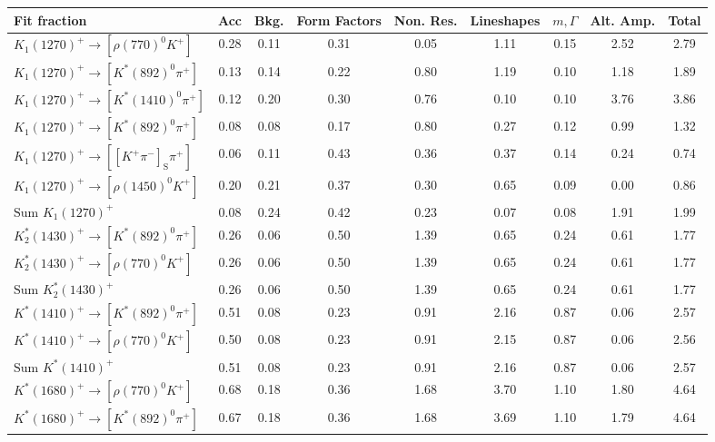 \begin{tabular}{l  c  c  c  c  c  c  c  | c }
\hline
\hline
Fit fraction & Acc & Bkg. & Form Factors & Non. Res. & Lineshapes & $m,\Gamma$ & Alt. Amp. &  Total  \\ 
\hline
$K_{1}(1270)^{+}\rightarrow \left[\rho(770)^{0}K^{+}\right]$ & 0.28 & 0.11 & 0.31 & 0.05 & 1.11 & 0.15 & 2.52 & 2.79 \\ 
$K_{1}(1270)^{+}\rightarrow \left[K^{*}(892)^{0}\pi^{+}\right]$ & 0.13 & 0.14 & 0.22 & 0.80 & 1.19 & 0.10 & 1.18 & 1.89 \\ 
$K_{1}(1270)^{+}\rightarrow \left[K^{*}(1410)^{0}\pi^{+}\right]$ & 0.12 & 0.20 & 0.30 & 0.76 & 0.10 & 0.10 & 3.76 & 3.86 \\ 
$K_{1}(1270)^{+}\rightarrow \left[K^{*}(892)^{0}\pi^{+}\right]$ & 0.08 & 0.08 & 0.17 & 0.80 & 0.27 & 0.12 & 0.99 & 1.32 \\ 
$K_{1}(1270)^{+}\rightarrow \left[\left[K^{+}\pi^{-}\right]_{\text{S}}\pi^{+}\right]$ & 0.06 & 0.11 & 0.43 & 0.36 & 0.37 & 0.14 & 0.24 & 0.74 \\ 
$K_{1}(1270)^{+}\rightarrow \left[\rho(1450)^{0}K^{+}\right]$ & 0.20 & 0.21 & 0.37 & 0.30 & 0.65 & 0.09 & 0.00 & 0.86 \\ 
$\text{Sum } K_{1}(1270)^{+}$ & 0.08 & 0.24 & 0.42 & 0.23 & 0.07 & 0.08 & 1.91 & 1.99 \\ 
$K_{2}^{*}(1430)^{+}\rightarrow \left[K^{*}(892)^{0}\pi^{+}\right]$ & 0.26 & 0.06 & 0.50 & 1.39 & 0.65 & 0.24 & 0.61 & 1.77 \\ 
$K_{2}^{*}(1430)^{+}\rightarrow \left[\rho(770)^{0}K^{+}\right]$ & 0.26 & 0.06 & 0.50 & 1.39 & 0.65 & 0.24 & 0.61 & 1.77 \\ 
$\text{Sum } K_{2}^{*}(1430)^{+}$ & 0.26 & 0.06 & 0.50 & 1.39 & 0.65 & 0.24 & 0.61 & 1.77 \\ 
$K^{*}(1410)^{+}\rightarrow \left[K^{*}(892)^{0}\pi^{+}\right]$ & 0.51 & 0.08 & 0.23 & 0.91 & 2.16 & 0.87 & 0.06 & 2.57 \\ 
$K^{*}(1410)^{+}\rightarrow \left[\rho(770)^{0}K^{+}\right]$ & 0.50 & 0.08 & 0.23 & 0.91 & 2.15 & 0.87 & 0.06 & 2.56 \\ 
$\text{Sum } K^{*}(1410)^{+}$ & 0.51 & 0.08 & 0.23 & 0.91 & 2.16 & 0.87 & 0.06 & 2.57 \\ 
$K^{*}(1680)^{+}\rightarrow \left[\rho(770)^{0}K^{+}\right]$ & 0.68 & 0.18 & 0.36 & 1.68 & 3.70 & 1.10 & 1.80 & 4.64 \\ 
$K^{*}(1680)^{+}\rightarrow \left[K^{*}(892)^{0}\pi^{+}\right]$ & 0.67 & 0.18 & 0.36 & 1.68 & 3.69 & 1.10 & 1.79 & 4.64 \\ 

\end{tabular}
